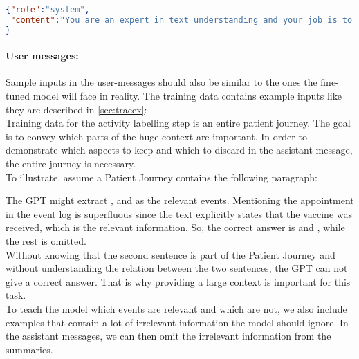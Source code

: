 \begin{lstlisting}[language=json, caption={System message for determining an activities start timestamp}, label={lst:system:starttime}]
{"role":"system",
 "content":"You are an expert in text understanding and your job is to take a given text and a given activity label and to extract a start date to this activity label. Only output the extracted start date! Rely on the context to determine the start date, as it might not be explicitly mentioned."
}
\end{lstlisting}

\paragraph{User messages:}\label{par:user-messages} Sample inputs in the user-messages should also be similar to the ones the fine-tuned model will face in reality. The training data contains example inputs like they are described in \autoref{sec:tracex}:\\
Training data for the activity labelling step is an entire patient journey. The goal is to convey which parts of the huge context are important. In order to demonstrate which aspects to keep and which to discard in the assistant-message, the entire journey is necessary.\\
To illustrate, assume a Patient Journey contains the following paragraph:
\begin{quote}
\end{quote}
The GPT might extract  ,  and  as the relevant events. Mentioning the appointment in the event log is superfluous since the text explicitly states that the vaccine was received, which is the relevant information. So, the correct answer is  and , while the rest is omitted.\\
Without knowing that the second sentence is part of the Patient Journey and without understanding the relation between the two sentences, the GPT can not give a correct answer. That is why providing a large context is important for this task.\\
To teach the model which events are relevant and which are not, we also include examples that contain a lot of irrelevant information the model should ignore. In the assistant messages, we can then omit the irrelevant information from the summaries.\\
